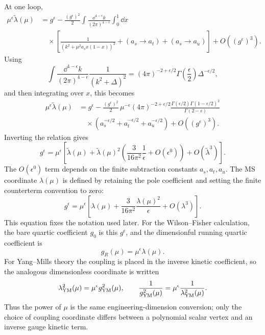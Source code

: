 At one loop,
\[
\begin{aligned}
  \mu^\epsilon\widetilde\lambda(\mu)
  &=
  g^\epsilon
  -
  \frac{(g^\epsilon)^2}{2}
  \int\frac{\dd^{4-\epsilon}k}{(2\pi)^{4-\epsilon}}
  \int_0^1\dd x                                      \\
  &\quad\times
  \left[
    \frac{1}{(k^2+\mu^2a_sx(1-x))^2}
    +(a_s\to a_t)+(a_s\to a_u)
  \right]
  +
  O((g^\epsilon)^3).
\end{aligned}
\]
Using
\[
  \int\frac{\dd^{4-\epsilon}k}{(2\pi)^{4-\epsilon}}
  \frac{1}{(k^2+\Delta)^2}
  =
  (4\pi)^{-2+\epsilon/2}
  \Gamma\!\left(\frac{\epsilon}{2}\right)
  \Delta^{-\epsilon/2},
\]
and then integrating over \(x\), this becomes
\[
\begin{aligned}
  \mu^\epsilon\widetilde\lambda(\mu)
  &=
  g^\epsilon
  -
  \frac{(g^\epsilon)^2}{2}\,
  \mu^{-\epsilon}
  (4\pi)^{-2+\epsilon/2}
  \frac{\Gamma(\epsilon/2)\Gamma(1-\epsilon/2)^2}
       {\Gamma(2-\epsilon)}
       \\
  &\quad\times
  \left(
    a_s^{-\epsilon/2}
    +a_t^{-\epsilon/2}
    +a_u^{-\epsilon/2}
  \right)
  +
  O((g^\epsilon)^3).
\end{aligned}
\]
Inverting the relation gives
\[
  g^\epsilon
  =
  \mu^\epsilon
  \left[
    \widetilde\lambda(\mu)
    +
    \widetilde\lambda(\mu)^2
    \left(
      \frac{3}{16\pi^2}\frac1{\epsilon}
      +
      O(\epsilon^0)
    \right)
    +
    O(\widetilde\lambda^3)
  \right].
\]
The \(O(\epsilon^0)\) term depends on the finite subtraction constants
\(a_s,a_t,a_u\).  The MS coordinate \(\lambda(\mu)\) is defined by retaining
the pole coefficient and setting the finite counterterm convention to zero:
\[
  g^\epsilon
  =
  \mu^\epsilon
  \left[
    \lambda(\mu)
    +
    \frac{3}{16\pi^2}
    \frac{\lambda(\mu)^2}{\epsilon}
    +
    O(\lambda^3)
  \right].
\]
This equation fixes the notation used later.  For the Wilson--Fisher
calculation, the bare quartic coefficient \(g_0\) is this \(g^\epsilon\), and
the dimensionful running quartic coefficient is
\[
  g_R(\mu)=\mu^\epsilon\lambda(\mu).
\]
For Yang--Mills theory the coupling is placed in the inverse kinetic
coefficient, so the analogous dimensionless coordinate is written
\[
  \lambda_{\rm YM}^2(\mu)=\mu^\epsilon g_{\rm YM}^2(\mu),
  \qquad
  \frac1{g_{\rm YM}^2(\mu)}
  =
  \mu^\epsilon\frac1{\lambda_{\rm YM}^2(\mu)} .
\]
Thus the power of \(\mu\) is the same engineering-dimension conversion; only
the choice of coupling coordinate differs between a polynomial scalar vertex
and an inverse gauge kinetic term.

